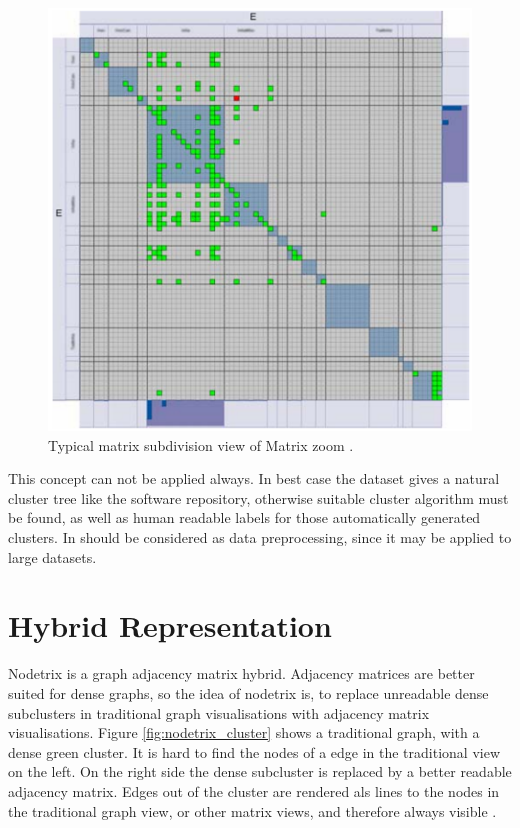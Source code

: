 \begin{figure}[h]
\centering
\includegraphics[width=\textwidth/2]{images/matrixzoom_cluster}
\caption{Typical matrix subdivision view of Matrix zoom \citep{ham2005phd}. \label{fig:matrixzoom_cluster}}
\end{figure}

This concept can not be applied always. In best case the dataset gives a natural cluster tree like the software repository, otherwise suitable cluster algorithm must be found, as well as human readable labels for those automatically generated clusters. In should be considered as data preprocessing, since it may be applied to large datasets.













\section{Hybrid Representation}
Nodetrix is a graph adjacency matrix hybrid. Adjacency matrices are better suited for dense graphs, so the idea of nodetrix is, to replace unreadable dense subclusters in traditional graph visualisations with adjacency matrix visualisations. Figure \ref{fig:nodetrix_cluster} shows a traditional graph, with a dense green cluster. It is hard to find the nodes of a edge in the traditional view on the left. On the right side the dense subcluster is replaced by a better readable  adjacency matrix. Edges out of the cluster are rendered als lines to the nodes in the traditional graph view, or other matrix views, and therefore always visible \citep{henry-nodetrix-2007}.



